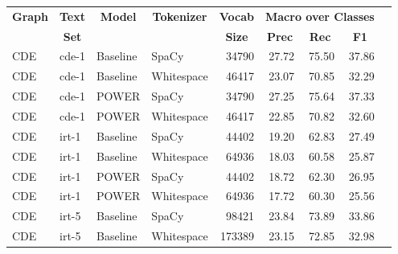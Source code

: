 \begin{tabular}{| l | l | l | l | r | r | r | r | r |}
    \hline

    \multicolumn{1}{|c|}{\textbf{Graph}} &
    \multicolumn{1}{|c|}{\textbf{Text}} &
    \multicolumn{1}{|c|}{\textbf{Model}} &
    \multicolumn{1}{|c|}{\textbf{Tokenizer}} &
    \multicolumn{1}{|c|}{\textbf{Vocab}} &
    \multicolumn{3}{|c|}{\textbf{Macro over Classes}} \\

    \multicolumn{1}{|c|}{} &
    \multicolumn{1}{|c|}{\textbf{Set}} &
    \multicolumn{1}{|c|}{} &
    \multicolumn{1}{|c|}{} &
    \multicolumn{1}{|c|}{\textbf{Size}} &
    \multicolumn{1}{|c|}{\textbf{Prec}} &
    \multicolumn{1}{|c|}{\textbf{Rec}} &
    \multicolumn{1}{|c|}{\textbf{F1}} \\

    \hline \hline

    CDE & cde-1 & Baseline & SpaCy & \num{34790} &
    27.72 & 75.50 & 37.86 \\

    CDE & cde-1 & Baseline & Whitespace & \num{46417} &
    23.07 & 70.85 & 32.29 \\

    CDE & cde-1 & POWER & SpaCy & \num{34790} &
    27.25 & 75.64 & 37.33 \\

    CDE & cde-1 & POWER & Whitespace & \num{46417} &
    22.85 & 70.82 & 32.60 \\

    \hline

    CDE & irt-1 & Baseline & SpaCy & \num{44402} &
    19.20 & 62.83 & 27.49 \\

    CDE & irt-1 & Baseline & Whitespace & \num{64936} &
    18.03 & 60.58 & 25.87 \\

    CDE & irt-1 & POWER & SpaCy & \num{44402} & 
    18.72 & 62.30 & 26.95 \\

    CDE & irt-1 & POWER & Whitespace & \num{64936} &
    17.72 & 60.30 & 25.56 \\

    \hline

    CDE & irt-5 & Baseline & SpaCy & \num{98421} &
    23.84 & 73.89 & 33.86 \\

    CDE & irt-5 & Baseline & Whitespace & \num{173389} &
    23.15 & 72.85 & 32.98 \\


\end{tabular}
